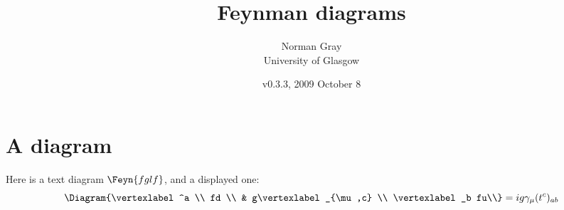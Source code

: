 \documentclass{beamer}
\title{Feynman diagrams}
\author{Norman Gray\\University of Glasgow}
\date{v0.3.3, 2009 October 8}
\begin{document}
\frame{\titlepage}

\section{A diagram}
\frame
{
Here is a text diagram $\Feyn{fglf}$, and a displayed one:
\[
     \Diagram{\vertexlabel^a \\ fd \\ & g\vertexlabel_{\mu,c} \\
          \vertexlabel_b fu\\}
     = \displaystyle
 	ig\gamma_\mu (t^c)_{ab}
\]
}
\end{document}
